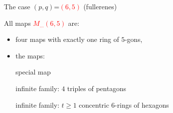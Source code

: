 \documentclass[%
pdf,
colorBG,
slideColor,
]{prosper}
\begin{document}
\begin{slide}{The case $(p,q)$=\textcolor{red}{$(6,5)$} (fullerenes)}

All maps \textcolor{red}{$M_{\dots}(6,5)$} are:
\begin{itemize}
\item four maps with exactly one ring of $5$-gons,
\item the maps:

\begin{center}
\begin{minipage}{3.5cm}
\centering
{}\par
special map
\end{minipage}
\begin{minipage}{3.5cm}
\centering
{}\par
infinite family: $4$ triples of pentagons
\end{minipage}
\begin{minipage}{3.5cm}
\centering
{}\par
infinite family:
$t\geq 1$ concentric
$6$-rings of hexagons
\end{minipage}
\end{center}

\end{itemize}

\end{slide}
\end{document}
